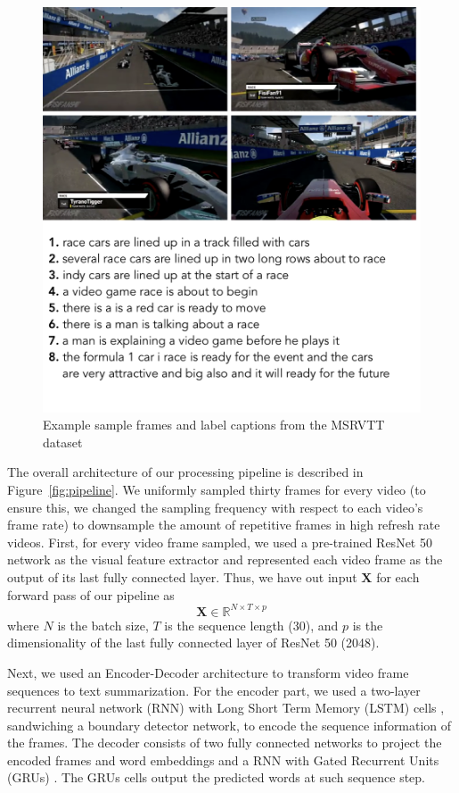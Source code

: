 \documentclass[11pt,a4paper]{article}
\newcommand{\X}{\mathbf{X}}
\newcommand{\R}{\mathds{R}}
\begin{document}
\begin{figure}
    \centering
    \includegraphics[width=\linewidth]{dataset.png}
    \caption{Example sample frames and label captions from the MSRVTT dataset \citet{Xu2016}}
    \label{fig:dataset}
\end{figure}

The overall architecture of our processing pipeline is described in Figure~\ref{fig:pipeline}. We uniformly sampled thirty frames for every video (to ensure this, we changed the sampling frequency with respect to each video's frame rate) to downsample the amount of repetitive frames in high refresh rate videos. First, for every video frame sampled, we used a pre-trained ResNet 50 \citet{DBLP:journals/corr/HeZRS15} network as the visual feature extractor and represented each video frame as the output of its last fully connected layer. Thus, we have out input $\X$ for each forward pass of our pipeline as 
\[\X \in \R^{N \times T \times p}\]
where $N$ is the batch size, $T$ is the sequence length (30), and $p$ is the dimensionality of the last fully connected layer of ResNet 50 (2048). 

Next, we used an Encoder-Decoder \cite{DBLP:journals/corr/ChoMGBSB14} architecture to transform video frame sequences to text summarization. For the encoder part, we used a two-layer recurrent neural network (RNN) with Long Short Term Memory (LSTM) cells \cite{hochreiter1997long}, sandwiching a boundary detector network, to encode the sequence information of the frames. The decoder consists of two fully connected networks to project the encoded frames and word embeddings and a RNN with Gated Recurrent Units (GRUs) \cite{DBLP:journals/corr/ChoMGBSB14}. The GRUs cells output the predicted words at such sequence step. 
\end{document}
